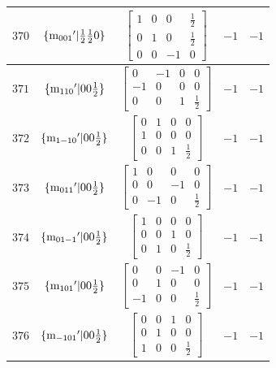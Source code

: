 \documentclass[fleqn,8pt]{jsarticle}
\begin{document}
\begin{longtable}{ccccc}
$ 370 $ & $ \{{\rm m}_{001}{}'|\frac{1}{2} \frac{1}{2} 0\} $ & $ \begin{bmatrix} 1 & 0 & 0 & \frac{1}{2} \\ 0 & 1 & 0 & \frac{1}{2} \\ 0 & 0 & -1 & 0 \end{bmatrix} $ & $ -1 $ & $ -1 $ \\ \hline
$ 371 $ & $ \{{\rm m}_{110}{}'|0 0 \frac{1}{2}\} $ & $ \begin{bmatrix} 0 & -1 & 0 & 0 \\ -1 & 0 & 0 & 0 \\ 0 & 0 & 1 & \frac{1}{2} \end{bmatrix} $ & $ -1 $ & $ -1 $ \\ \hline
$ 372 $ & $ \{{\rm m}_{1-10}{}'|0 0 \frac{1}{2}\} $ & $ \begin{bmatrix} 0 & 1 & 0 & 0 \\ 1 & 0 & 0 & 0 \\ 0 & 0 & 1 & \frac{1}{2} \end{bmatrix} $ & $ -1 $ & $ -1 $ \\ \hline
$ 373 $ & $ \{{\rm m}_{011}{}'|0 0 \frac{1}{2}\} $ & $ \begin{bmatrix} 1 & 0 & 0 & 0 \\ 0 & 0 & -1 & 0 \\ 0 & -1 & 0 & \frac{1}{2} \end{bmatrix} $ & $ -1 $ & $ -1 $ \\ \hline
$ 374 $ & $ \{{\rm m}_{01-1}{}'|0 0 \frac{1}{2}\} $ & $ \begin{bmatrix} 1 & 0 & 0 & 0 \\ 0 & 0 & 1 & 0 \\ 0 & 1 & 0 & \frac{1}{2} \end{bmatrix} $ & $ -1 $ & $ -1 $ \\ \hline
$ 375 $ & $ \{{\rm m}_{101}{}'|0 0 \frac{1}{2}\} $ & $ \begin{bmatrix} 0 & 0 & -1 & 0 \\ 0 & 1 & 0 & 0 \\ -1 & 0 & 0 & \frac{1}{2} \end{bmatrix} $ & $ -1 $ & $ -1 $ \\ \hline
$ 376 $ & $ \{{\rm m}_{-101}{}'|0 0 \frac{1}{2}\} $ & $ \begin{bmatrix} 0 & 0 & 1 & 0 \\ 0 & 1 & 0 & 0 \\ 1 & 0 & 0 & \frac{1}{2} \end{bmatrix} $ & $ -1 $ & $ -1 $ \\ \hline

\end{longtable}
\end{document}

